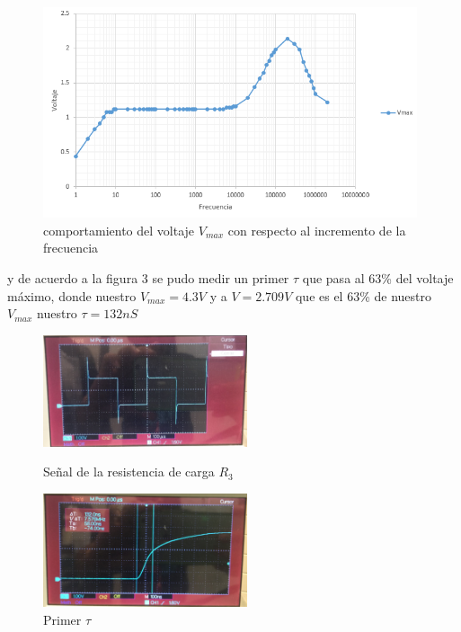 \documentclass{report}
\begin{document}
	\begin{figure}[H]
		\begin{center}
			\includegraphics[width=11cm]{3}
			\caption{comportamiento del voltaje $V_{max}$ con respecto al incremento de la frecuencia}
		\end{center}
	\end{figure}

	y de acuerdo a la figura 3 se pudo medir un primer $\tau$ que pasa al 63\% del voltaje máximo, donde nuestro $V_{max}=4.3V$ y a $V=2.709V$ que es el 63\% de nuestro $V_{max}$ nuestro $\tau=132nS$
	
	\begin{figure}[H]
	\begin{minipage}[b]{0.5\linewidth} %
		\centering
		\includegraphics[width=6cm]{5}
		\caption{Señal de la resistencia de carga $R_3$}\label{fig3}
	\end{minipage}
	\hspace{0.5cm} %
	\begin{minipage}[b]{0.5\linewidth}
		\centering
		\includegraphics[width=6cm]{4}
		\caption{Primer $\tau$}\label{fig4}
	\end{minipage}
	\end{figure}
	
\end{document}
